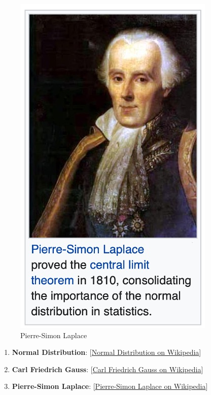 \documentclass[
  12 pt,
  a4paper,
]{book}
\numberwithin{equation}{section}
\theoremstyle{plain}      %
\theoremstyle{definition} %
\theoremstyle{remark}     %
\theoremstyle{note}         %
\begin{document}
\begin{figure}[htbp]
\begin{minipage}[t]{0.40\textwidth}
        \includegraphics[width=\textwidth, height=0.3\textheight]{pictures/laplace.jpeg}
        \caption{Pierre-Simon Laplace}
    \end{minipage}

    \label{fig:normal-distribution-layout}
\end{figure}

\begin{enumerate}
\def\labelenumi{\arabic{enumi}.}
\item
  \textbf{Normal Distribution}:
  {[}\href{https://en.wikipedia.org/wiki/Normal_distribution}{Normal Distribution on Wikipedia}{]}
\item
  \textbf{Carl Friedrich Gauss}:
  {[}\href{https://en.wikipedia.org/wiki/Carl_Friedrich_Gauss}{Carl Friedrich Gauss on Wikipedia}{]}
\item
  \textbf{Pierre-Simon Laplace}:
  {[}\href{https://en.wikipedia.org/wiki/Pierre-Simon_Laplace}{Pierre-Simon Laplace on Wikipedia}{]}
  \newpage
\end{enumerate}
\end{document}
